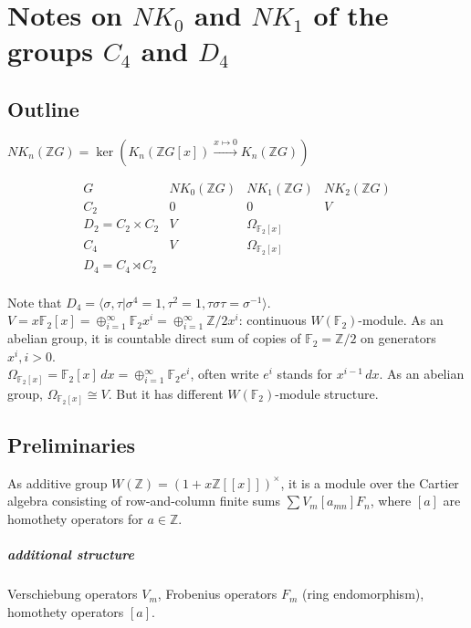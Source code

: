 \chapter{Notes on $NK_0$ and $NK_1$ of the groups $C_4$ and $D_4$}
\section{Outline}
\begin{definition}
$NK_n(\mathbb{Z}G)=\ker(K_n(\mathbb{Z}G[x])\overset{x\mapsto 0}\longrightarrow K_n(\mathbb{Z}G))$
\end{definition}
\begin{equation*}
	\begin{array}{c|c|c|c}
	G& NK_0(\mathbb{Z}G) & NK_1(\mathbb{Z}G) &NK_2(\mathbb{Z}G) \\
	\hline
	C_2 & 0 & 0&V \\
	\hline
	D_2=C_2\times C_2&V&\Omega_{\mathbb{F}_2[x]} & \\
	\hline
	C_4 & V&\Omega_{\mathbb{F}_2[x]} & \\
	\hline
	D_4=C_4\rtimes C_2& \\
	\end{array}
\end{equation*}

Note that $D_4=\langle \sigma, \tau|\sigma^4=1,\tau^2=1,\tau \sigma \tau=\sigma^{-1} \rangle$.\\
$V=x \mathbb{F}_2[x]=\oplus_{i=1}^\infty \mathbb{F}_2 x^i = \oplus_{i=1}^\infty \mathbb{Z}/2 x^i$: continuous $W(\mathbb{F}_2)$-module. As an abelian group, it is countable direct sum of copies of $\mathbb{F}_2=\mathbb{Z}/2$ on generators $x^i,i>0$.\\
$\Omega_{\mathbb{F}_2[x]}= \mathbb{F}_2[x]\,dx = \oplus_{i=1}^\infty \mathbb{F}_2 e^i $, often write $e^i$ stands for $x^{i-1}\, dx$. As an abelian group, $\Omega_{\mathbb{F}_2[x]}\cong V$. But it has different $W(\mathbb{F}_2)$-module structure.

\section{Preliminaries}
As additive group $W(\mathbb{Z})=(1+x \mathbb{Z}[[x]])^{\times}$, it is a module over the Cartier algebra consisting of row-and-column finite sums $\sum V_m [a_{mn}]F_n$, where $[a]$ are homothety operators for $a\in \mathbb{Z}$.

\paragraph{additional structure}
Verschiebung operators $V_m$, Frobenius operators $F_m$ (ring endomorphism), homothety operators $[a]$.

